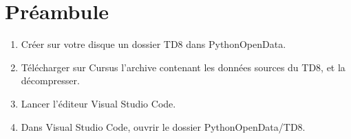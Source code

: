\documentclass[11pt,a4paper]{article}
\begin{document}
\section*{Préambule}
\begin{enumerate}
    \item Créer sur votre disque un dossier TD8 dans PythonOpenData. 
    \item Télécharger sur Cursus l'archive contenant les données sources du TD8, et la décompresser.
    \item Lancer l'éditeur Visual Studio Code.
    \item Dans Visual Studio Code, ouvrir le dossier PythonOpenData/TD8. 
\end{enumerate}
\end{document}
